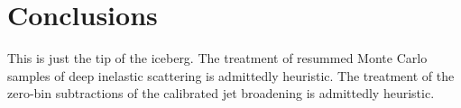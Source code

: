 \section{Conclusions}\label{sec:conclusions}

This is just the tip of the iceberg. The treatment of resummed Monte
Carlo samples of deep inelastic scattering is admittedly heuristic. The
treatment of the zero-bin subtractions of the calibrated jet broadening
is admittedly heuristic.

